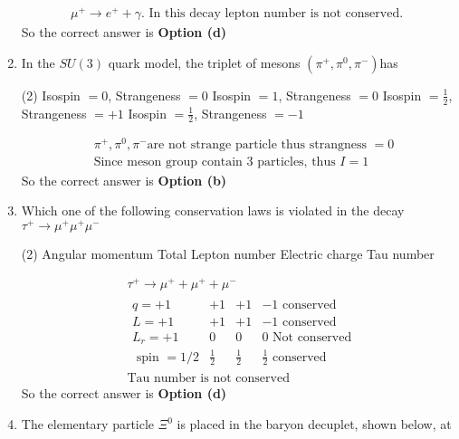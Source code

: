\begin{enumerate}
\begin{answer}
	\begin{align*}
	\mu^{+} \rightarrow e^{+}+\gamma \text {. In this decay lepton number is not conserved. }
	\end{align*}
		So the correct answer is \textbf{Option (d)}
\end{answer}
	\item  In the $S U(3)$ quark model, the triplet of mesons $\left(\pi^{+}, \pi^0, \pi^{-}\right)$has
	{}
	 \begin{tasks}(2)
		\task[\textbf{a.}]Isospin $=0$, Strangeness $=0$
		\task[\textbf{b.}] Isospin $=1$, Strangeness $=0$
		\task[\textbf{c.}]Isospin $=\frac{1}{2}$, Strangeness $=+1$
		\task[\textbf{d.}]  Isospin $=\frac{1}{2}$, Strangeness $=-1$
	\end{tasks}
\begin{answer}
	\begin{align*}
	&\text{$\pi^{+}, \pi^0, \pi^{-}$are not strange particle thus strangness $=0$} \\
	&\text{Since meson group contain 3 particles, thus $I=1$}
	\end{align*}
		So the correct answer is \textbf{Option (b)}
\end{answer}
	\item  Which one of the following conservation laws is violated in the decay $\tau^{+} \rightarrow \mu^{+} \mu^{+} \mu^{-}$
	{}
	 \begin{tasks}(2)
		\task[\textbf{a.}]Angular momentum
		\task[\textbf{b.}]Total Lepton number
		\task[\textbf{c.}]Electric charge
		\task[\textbf{d.}]Tau number 
	\end{tasks}
\begin{answer}
	\begin{align*}
	&\tau^{+} \rightarrow \mu^{+}+\mu^{+}+\mu^{-}\\
	&\begin{array}{lccc}
	q=+1 & +1 & +1 & -1 \text { conserved } \\
	L=+1 & +1 & +1 & -1 \text { conserved } \\
	L_r=+1 & 0 & 0 & 0 \text { Not conserved } \\
	\text { spin }=1 / 2 & \frac{1}{2} & \frac{1}{2} & \frac{1}{2} \text { conserved }
	\end{array}\\
	&\text{Tau number is not conserved}
	\end{align*}
		So the correct answer is \textbf{Option (d)}
\end{answer}
	\item  The elementary particle $\Xi^0$ is placed in the baryon decuplet, shown below, at

\end{enumerate}
